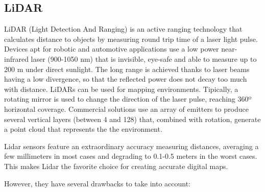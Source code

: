 \subsection{LiDAR}
LiDAR (Light Detection And Ranging) is an active ranging technology that calculates distance to objects by measuring round trip time of a laser light pulse.
Devices apt for robotic and automotive applications use a low power 
near-infrared laser (900-1050 nm) that is invisible, eye-safe and able to 
measure up to 200 m under direct sunlight. The long range is achieved thanks to
laser beams having a low divergence, so that the reflected power does not decay
too much with distance.
LiDARs can be used for mapping environments. Tipically, a rotating mirror is used to change the direction of the laser pulse, reaching 360º horizontal coverage. Commercial solutions use an array of emitters to produce several vertical layers (between 4 and 128) that, combined with rotation, generate a point cloud that represents the the environment.

Lidar sensors feature an extraordinary accuracy measuring distances, averaging
a few millimeters in most cases and degrading to 0.1-0.5 meters in the worst 
cases. This makes Lidar the favorite choice for creating accurate digital maps.

However, they have several drawbacks to take into account:

